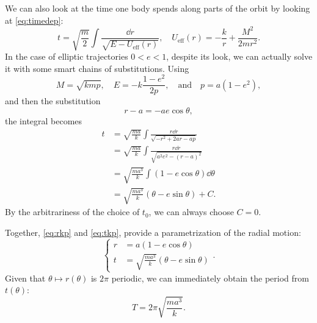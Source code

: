 \documentclass[english,fontsize=11pt,paper=b5]{scrbook}
\numberwithin{equation}{chapter}
\theoremstyle{definition}
\begin{document}
    We can also look at the time one body spends along parts of the orbit by looking at \eqref{eq:timedep}:
    \begin{equation}
      t = \sqrt{\frac{m}{2}}
      \int \frac{\dd r}{\sqrt{E - U_{\mathrm{eff}}(r)}}, \quad U_{\mathrm{eff}}(r) = -\frac kr + \frac {M^2}{2 m r^2}.
    \end{equation}
    In the case of elliptic trajectories $0<e<1$, despite its look, we can actually solve it with some smart chains of substitutions. Using
    \begin{equation}
      M = \sqrt{kmp}, \quad E = -k \frac{1-e^2}{2p}, \quad\mbox{and}\quad p= a(1-e^2),
    \end{equation}
    and then the substitution
    \begin{equation}\label{eq:rkp}
      r - a = - a e \cos \theta,
    \end{equation}
    the integral becomes
    \begin{align}
      t & = \sqrt{\frac {ma}k} \int \frac{r\dd r}{\sqrt{-r^2 + 2ar -ap}}      \\
        & = \sqrt{\frac {ma}k} \int \frac{r\dd r}{\sqrt{a^2e^2 - (r-a)^2}}    \\
        & = \sqrt{\frac{ma^3}{k}} \int (1- e \cos\theta) \dd \theta           \\
        & = \sqrt{\frac{ma^3}{k}} (\theta- e \sin\theta) + C. \label{eq:tkp}
    \end{align}
    By the arbitrariness of the choice of $t_0$, we can always choose $C=0$.

    Together, \eqref{eq:rkp} and \eqref{eq:tkp}, provide a parametrization of the radial motion:
    \begin{equation}
      \left\lbrace
        \begin{aligned}
          r & = a(1-e\cos\theta)                          \\
          t & = \sqrt{\frac{ma^3}k}(\theta - e\sin\theta)
        \end{aligned}
      \right..
    \end{equation}
    Given that $\theta\mapsto r(\theta)$ is $2\pi$ periodic, we can immediately obtain the period from $t(\theta)$:
    \begin{equation}
      T = 2\pi \sqrt{\frac{ma^3}k}.
    \end{equation}
\end{document}
